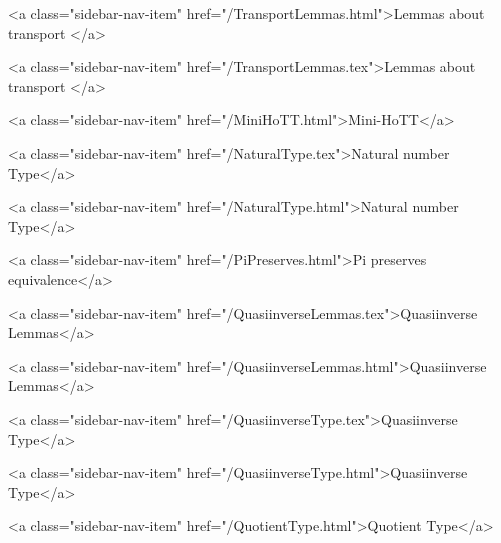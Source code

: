       
        
          <a class="sidebar-nav-item" href="/TransportLemmas.html">Lemmas about transport </a>
        
      
    
      
        
          <a class="sidebar-nav-item" href="/TransportLemmas.tex">Lemmas about transport </a>
        
      
    
      
        
          <a class="sidebar-nav-item" href="/MiniHoTT.html">Mini-HoTT</a>
        
      
    
      
        
          <a class="sidebar-nav-item" href="/NaturalType.tex">Natural number Type</a>
        
      
    
      
        
          <a class="sidebar-nav-item" href="/NaturalType.html">Natural number Type</a>
        
      
    
      
        
          <a class="sidebar-nav-item" href="/PiPreserves.html">Pi preserves equivalence</a>
        
      
    
      
        
          <a class="sidebar-nav-item" href="/QuasiinverseLemmas.tex">Quasiinverse Lemmas</a>
        
      
    
      
        
          <a class="sidebar-nav-item" href="/QuasiinverseLemmas.html">Quasiinverse Lemmas</a>
        
      
    
      
        
          <a class="sidebar-nav-item" href="/QuasiinverseType.tex">Quasiinverse Type</a>
        
      
    
      
        
          <a class="sidebar-nav-item" href="/QuasiinverseType.html">Quasiinverse Type</a>
        
      
    
      
        
          <a class="sidebar-nav-item" href="/QuotientType.html">Quotient Type</a>
        
